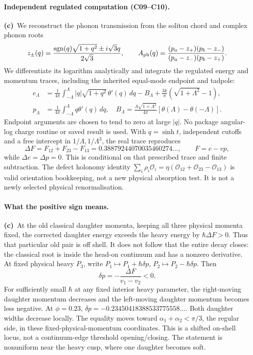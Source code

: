 \documentclass[11pt,a4paper]{article}
\newcommand{\Lc}{\textbf{(c)}\ }
\begin{document}
\paragraph{Independent regulated computation (C09--C10).}
\Lc We reconstruct the phonon transmission from the soliton chord and complex
phonon roots
\[
 z_\pm(q)=\frac{\operatorname{sgn}(q)\sqrt{1+q^2}\pm i\sqrt3q}{2\sqrt3},\qquad
 A_{\rm ph}(q)=\frac{(p_a-z_+)(p_b-z_-)}{(p_a-z_-)(p_b-z_+)}.
\]
We differentiate its logarithm analytically and integrate the regulated
energy and momentum traces, including the inherited equal-mode endpoint and
tadpole:
\begin{align}
 e_\Lambda&=\frac1{4\pi}\int_{-\Lambda}^{\Lambda}
 |q|\sqrt{1+q^2}\,\theta'(q)\,dq-B_\Lambda
 +\frac{3k}{\pi}(\sqrt{1+\Lambda^2}-1),\\
 p_\Lambda&=\frac1{4\pi}\int_{-\Lambda}^{\Lambda}q\theta'(q)\,dq,\quad
 B_\Lambda=\frac{\Lambda\sqrt{1+\Lambda^2}}{4\pi}
 [\theta(\Lambda)-\theta(-\Lambda)].
\end{align}
Endpoint arguments are chosen to tend to zero at large $|q|$. No package
angular-log charge routine or saved result is used. With $q=\sinh t$,
independent cutoffs and a free intercept in $1/\Lambda,1/\Lambda^3$, the real
trace reproduces
\begin{equation}
 \Delta F=F_{12}+F_{23}-F_{13}
 =0.38879244070035460274\ldots,\qquad F=e-vp,
 \label{df}
\end{equation}
while $\Delta e=\Delta p=0$. This is conditional on that prescribed trace and
finite subtraction. The defect holonomy identity
$\sum_i\rho_i\mathcal O_i=\eta(\mathcal O_{12}+\mathcal O_{23}-\mathcal O_{13})$
is valid orientation bookkeeping, not a new physical absorption test. It is not a newly selected physical renormalisation.

\paragraph{What the positive sign means.}
\Lc At the old classical daughter momenta, keeping all three physical momenta
fixed, the corrected daughter energy exceeds the heavy energy by
$\hbar\Delta F>0$. Thus that particular old pair is off shell. It does not
follow that the entire decay closes: the classical root is inside the
head-on continuum and has a nonzero derivative. At fixed physical heavy $P_3$,
write $P_1\mapsto P_1+\hbar\delta p$, $P_2\mapsto P_2-\hbar\delta p$. Then
\begin{equation}
 \delta p=-\frac{\Delta F}{v_1-v_2}<0.
\end{equation}
For sufficiently small $\hbar$ at any fixed interior heavy parameter,
the right-moving daughter momentum decreases and the left-moving daughter
momentum becomes less negative. At $\phi=0.23$,
$\delta p=-0.23450418388533775558\ldots$. Both daughter widths decrease locally.
The equality moves toward $\alpha_1+\alpha_2<\pi/3$, the regular side, in
these fixed-physical-momentum coordinates. This is a shifted on-shell locus,
not a continuum-edge threshold opening/closing. The statement is nonuniform
near the heavy cusp, where one daughter becomes soft.
\end{document}
